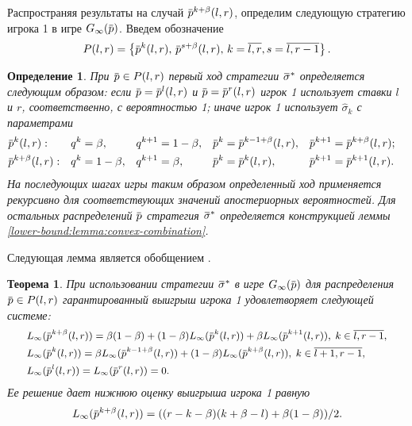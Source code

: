 \documentclass[12pt, draft]{extarticle}
\newtheorem{definition}{Определение}
\newtheorem{theorem}{Теорема}
\newcommand{\overbar}[1]%
{\mkern 1.5mu\overline{\mkern-1.3mu#1\mkern-1.3mu}\mkern 1.3mu}
\newcommand{\p}{\ensuremath{\overbar{p}}}
\newcommand{\G}[1][n]{\ensuremath{G_{#1}}}
\newcommand{\sigmav}{\ensuremath{\overbar{\sigma}}}
\newcommand{\sigmak}{\ensuremath{\hat{\sigma}}}
\newcommand{\Low}[1][\ensuremath{\infty}]{\ensuremath{L_{#1}}}
\begin{document}
Распространяя результаты \cite{bib:pyanykh16} на случай $\p^{k+\beta}(l, r)$,
определим следующую стратегию игрока 1 в игре $\G[\infty](\p)$. Введем
обозначение %
\begin{equation*}
  P(l,r) = \left\{
    \p^k(l, r), \, \p^{s+\beta}(l, r), \, k = \overline{l,r}, s = \overline{l,r-1}
  \right\}.
\end{equation*}

\begin{definition}
  При $\p \in P(l,r)$ первый ход стратегии $\sigmav^*$ определяется следующим
  образом: если $\p = \p^l(l,r)$ и $\p = \p^r(l,r)$ игрок 1 использует ставки
  $l$ и $r$, соответственно, с вероятностью 1; иначе игрок 1 использует
  $\sigmak_k$ с параметрами
  \begin{align*}
    &\p^k(l, r):&
    &q^k = \beta,&
    &q^{k+1} = 1-\beta,&
    &\p^k = \p^{k-1+\beta}(l, r),&
    &\p^{k+1} = \p^{k+\beta}(l, r);&\\
    &\p^{k+\beta}(l, r):&
    &q^k = 1-\beta,&
    &q^{k+1} = \beta,&
    &\p^k = \p^k(l, r),&
    &\p^{k+1} = \p^{k+1}(l, r).&
  \end{align*}
  На последующих шагах игры таким образом определенный ход применяется
  рекурсивно для соответствующих значений апостериорных вероятностей. Для
  остальных распределений $\p$ стратегия $\sigmav^*$ определяется конструкцией
  леммы \ref{lower-bound:lemma:convex-combination}.
\end{definition}

Следующая лемма является обобщением \cite[Утверждение 5]{bib:pyanykh16}.
\begin{theorem}
  \label{lower-bound:theorem}
  При использовании стратегии $\sigmav^*$ в игре $\G[\infty](\p)$ для
  распределения %
  $\p \in P(l,r)$ %
  гарантированный выигрыш игрока 1 удовлетворяет следующей системе:
  \begin{equation}
    \small
    \label{lower-bound:eq:Linf-recurrence}
    \begin{aligned}
      &\Low(\p^{k+\beta}(l,r)) =
      \beta(1-\beta) + (1-\beta) \Low(\p^k(l, r)) + \beta \Low(\p^{k+1}(l, r)), \;
      k \in \overline{l, r - 1}, \\
      &\Low(\p^k(l,r)) =
      \beta \Low(\p^{k-1+\beta}(l, r)) + (1-\beta) \Low(\p^{k+\beta}(l, r)), \;
      k \in \overline{l + 1, r - 1},\\
      &\Low(\p^l(l,r)) = \Low(\p^r(l,r)) = 0.
    \end{aligned}
  \end{equation}
  Ее решение дает нижнюю оценку выигрыша игрока 1 равную
  \begin{equation*}
    \label{lower-bound:eq:Linf-recurrence-solution}
    \Low(\p^{k+\beta}(l, r)) = ((r-k-\beta)(k+\beta-l) + \beta(1-\beta))/2.
  \end{equation*}
\end{theorem}
\end{document}
